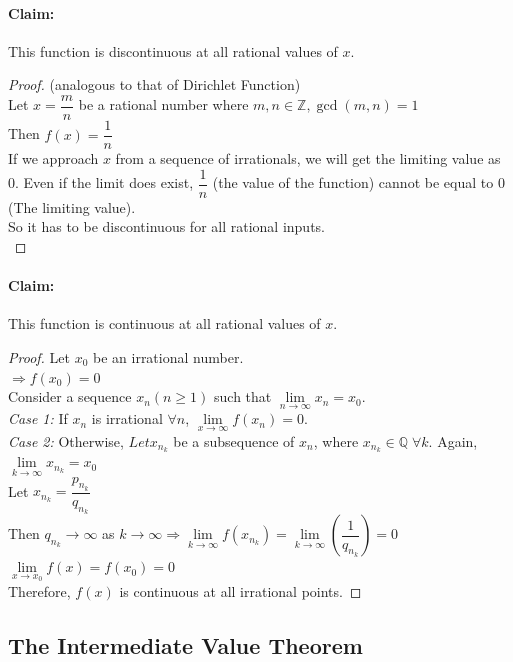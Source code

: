 \documentclass[14]{article}
\theoremstyle{definition}
\theoremstyle{case}
\begin{document}
\paragraph{Claim:} This function is discontinuous at all rational values of $x$.
\begin{proof}(analogous to that of Dirichlet Function)\\
Let $x = \dfrac{m}{n}$ be a rational number where $m, n \in \mathbb{Z}, \gcd(m, n) = 1$\\
Then $f(x) = \dfrac{1}{n}$\\
If we approach $x$ from a sequence of irrationals, we will get the limiting value as $0$. Even if the limit does exist, $\dfrac{1}{n}$ (the value of the function) cannot be equal to $0$ (The limiting value).\\
So it has to be discontinuous for all rational inputs.\\
\end{proof}
\paragraph{Claim:} This function is continuous at all rational values of $x$.
\begin{proof}
Let $x_0$ be an irrational number.\\
$\Rightarrow f(x_0) = 0$\\
Consider a sequence $x_n (n \geq 1)$ such that $\lim\limits_{n \to \infty} x_n = x_0$.\\
\textit{Case 1:} If $x_n$ is irrational $\forall n$, $\lim\limits_{x \to \infty} f(x_n) = 0$.\\
\textit{Case 2:} Otherwise, $Let x_{n_k}$ be a subsequence of $x_n$, where $x_{n_k} \in \mathbb{Q}\; \forall k$. Again, $\lim\limits_{k \to \infty} x_{n_k} = x_0$\\
Let $x_{n_k} = \dfrac{p_{n_k}}{q_{n_k}}$\\
Then $q_{n_k} \to \infty$ as $k \to \infty \Rightarrow \lim\limits_{k \to \infty}f(x_{n_k}) = \lim\limits_{k \to \infty}\left(\dfrac{1}{q_{n_k}}\right) = 0$\\
$\lim\limits_{x \to x_0} f(x) = f(x_0) = 0$\\
Therefore, $f(x)$ is continuous at all irrational points.
\end{proof}
\pagebreak
\subsection{The Intermediate Value Theorem}
\end{document}
